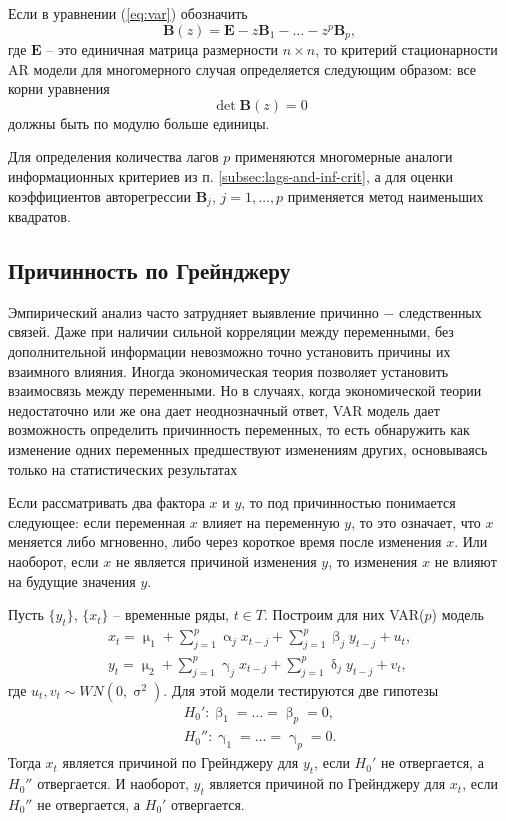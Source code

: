 \documentclass[a4paper, 14pt]{extreport}
\numberwithin{equation}{section}
\renewcommand{\alpha}{\upalpha}
\renewcommand{\beta}{\upbeta}
\renewcommand{\gamma}{\upgamma}
\renewcommand{\delta}{\updelta}
\renewcommand{\mu}{\upmu}
\renewcommand{\sigma}{\upsigma}
\numberwithin{equation}{section}
\begin{document}
	Если в уравнении (\ref{eq:var}) обозначить
	\begin{equation}
		\mathbf B(z) = \mathbf E - z\mathbf B_1 -\ldots - z^p \mathbf B_p,
	\end{equation}
	где $\mathbf E$ -- это единичная матрица размерности $n\times n$, то критерий стационарности AR модели для многомерного случая определяется следующим образом:
	все корни уравнения \begin{equation}
		\det \mathbf B(z) = 0
	\end{equation}
	должны быть по модулю больше единицы.
	
	Для определения количества лагов $p$ применяются многомерные аналоги информационных критериев из п. \ref{subsec:lags-and-inf-crit}, а для оценки коэффициентов авторегрессии $\mathbf B_j$, $j=1,\ldots,p$  применяется метод наименьших квадратов.
	
	\subsection{Причинность по Грейнджеру}
	\label{subsec:granger}
	
	Эмпирический анализ часто затрудняет выявление причинно $-$ следственных связей. Даже при наличии сильной корреляции между переменными, без дополнительной информации невозможно точно установить причины их взаимного влияния. Иногда экономическая теория позволяет установить взаимосвязь между переменными. Но в случаях, когда экономической теории недостаточно или же она дает неоднозначный ответ, VAR модель дает возможность определить причинность переменных, то есть обнаружить как изменение одних переменных предшествуют изменениям других, основываясь только на статистических результатах
	
	Если рассматривать два фактора $x$ и $y$, то под причинностью понимается следующее:
	если переменная $x$ влияет на переменную $y$, то это означает, что $x$ меняется
	либо мгновенно, либо через короткое время после изменения $x$. Или наоборот, если $x$ не является причиной
	изменения $y$, то изменения $x$ не влияют на будущие значения $y$.
	
	Пусть $\{y_t\}$, $\{x_t\}$ -- временные ряды, $t\in T$. Построим для них VAR($p$) модель
	\begin{align*}
		x_t = \mu_1 + \sum_{j=1}^{p} \alpha_j x_{t-j} + \sum_{j=1}^{p} \beta_j y_{t-j} + u_t,\\
		y_t = \mu_2 + \sum_{j=1}^{p} \gamma_j x_{t-j} + \sum_{j=1}^{p} \delta_j y_{t-j} + v_t,
	\end{align*} 
	где $u_t,v_t\sim WN(0,\sigma^2)$. Для этой модели тестируются две гипотезы
	\begin{align*}
		H_0' : \beta_1=\ldots = \beta_p =0,\\
		H_0'' : \gamma_1 = \ldots = \gamma_p = 0.
	\end{align*}
	Тогда $x_t$ является причиной по Грейнджеру для $y_t$, если $H_0'$ не отвергается, а $H_0''$ отвергается. И наоборот, $y_t$ является причиной по Грейнджеру для $x_t$, если $H_0''$ не отвергается, а $H_0'$ отвергается.
	
\end{document}

